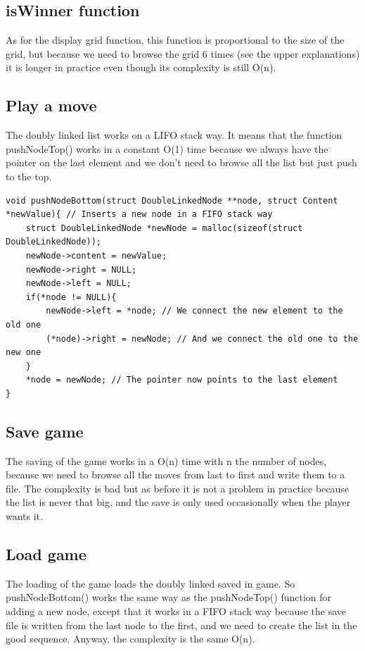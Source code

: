 \documentclass[10pt, a4paper]{article}
\begin{document}
\subsection{isWinner function}
As for the display grid function, this function is proportional to the size of the grid, but because we need to browse the grid 6 times (see the upper explanations) it is longer in practice even though its complexity is still O(n).

\subsection{Play a move}
The doubly linked list works on a LIFO stack way. It means that the function pushNodeTop() works in a constant O(1) time because we always have the pointer on the last element and we don't need to browse all the list but just push to the top.

\begin{lstlisting}
void pushNodeBottom(struct DoubleLinkedNode **node, struct Content *newValue){ // Inserts a new node in a FIFO stack way
	struct DoubleLinkedNode *newNode = malloc(sizeof(struct DoubleLinkedNode));
	newNode->content = newValue;
	newNode->right = NULL;
	newNode->left = NULL;
	if(*node != NULL){
		newNode->left = *node; // We connect the new element to the old one
		(*node)->right = newNode; // And we connect the old one to the new one
	}
	*node = newNode; // The pointer now points to the last element
}
\end{lstlisting}

\subsection{Save game}
The saving of the game works in a O(n) time with n the number of nodes, because we need to browse all the moves from last to first and write them to a file. The complexity is bad but as before it is not a problem in practice because the list is never that big, and the save is only used occasionally when the player wants it.

\subsection{Load game}
The loading of the game loads the doubly linked saved in game. So pushNodeBottom() works the same way as the pushNodeTop() function for adding a new node, except that it works in a FIFO stack way because the save file is written from the last node to the first, and we need to create the list in the good sequence. Anyway, the complexity is the same O(n).
\end{document}
